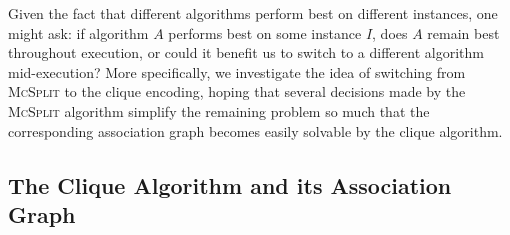 \documentclass{l4proj}
\theoremstyle{definition}
\theoremstyle{remark}
\begin{document}
Given the fact that different algorithms perform best on different instances,
one might ask: if algorithm $A$ performs best on some instance $I$, does $A$
remain best throughout execution, or could it benefit us to switch to a
different algorithm mid-execution? More specifically, we investigate the idea of
switching from \textsc{McSplit} to the clique encoding, hoping that several
decisions made by the \textsc{McSplit} algorithm simplify the remaining problem
so much that the corresponding association graph becomes easily solvable by the
clique algorithm.

\subsection{The Clique Algorithm and its Association Graph} \label{sec:clique}
\end{document}
